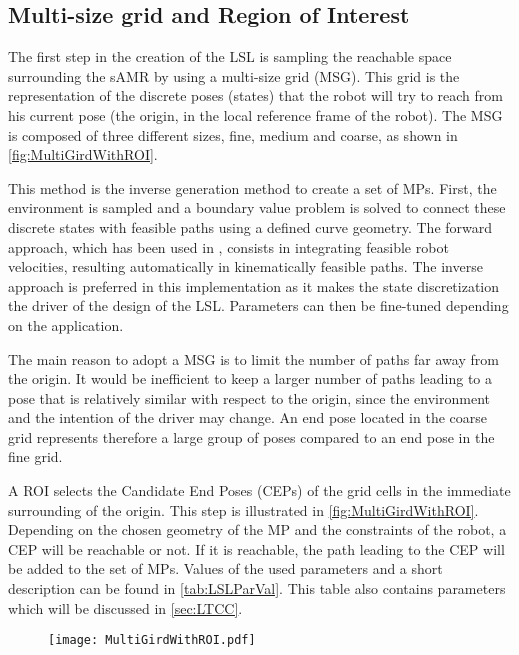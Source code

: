 \subsection{Multi-size grid and Region of Interest} \label{sec:MultiGrid}
The first step in the creation of the LSL is sampling the reachable space surrounding the sAMR by using a multi-size grid (MSG). This grid is the representation of the discrete poses (states) that the robot will try to reach from his current pose (the origin, in the local reference frame of the robot). The MSG is composed of three different sizes, fine, medium and coarse, as shown in \cref{fig:MultiGirdWithROI}.

This method is the inverse generation method to create a set of MPs. First, the environment is sampled and a boundary value problem is solved to connect these discrete states with feasible paths using a defined curve geometry. The forward approach, which has been used in \cite{DemeesterEtAl2012}, consists in integrating feasible robot velocities, resulting automatically in kinematically feasible paths. The inverse approach is preferred in this implementation as it makes the state discretization the driver of the design of the LSL. Parameters can then be fine-tuned depending on the application.

The main reason to adopt a MSG is to limit the number of paths far away from the origin. It would be inefficient to keep a larger number of paths leading to a pose that is relatively similar with respect to the origin, since the environment and the intention of the driver may change. An end pose located in the coarse grid represents therefore a large group of poses compared to an end pose in the fine grid.

A ROI selects the Candidate End Poses (CEPs) of the grid cells in the immediate surrounding of the origin. This step is illustrated in \cref{fig:MultiGirdWithROI}. Depending on the chosen geometry of the MP and the constraints of the robot, a CEP will be reachable or not. If it is reachable, the path leading to the CEP will be added to the set of MPs. Values of the used parameters and a short description can be found in \cref{tab:LSLParVal}. This table also contains parameters which will be discussed in \cref{sec:LTCC}.

\begin{figure}[!htbp]
\centering
\texttt{[image: MultiGirdWithROI.pdf]} 
\end{figure}

